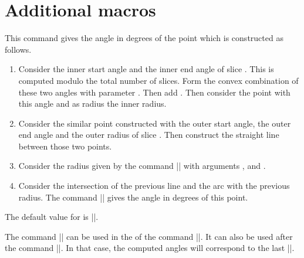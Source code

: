 \documentclass[a4paper,english,dvipsnames]{ltxdoc}
\begin{document}
\section{Additional macros}
\begin{command}{\WCangle{}}
This command gives the angle in degrees of the point which is constructed as follows.
\begin{enumerate}
\item Consider the inner start angle and the inner end angle of slice . This  is computed modulo the total number of slices. Form the convex combination of these two angles with parameter . Then add . Then consider the point with this angle and as radius the inner radius.
\item Consider the similar point constructed with the outer start angle, the outer end angle and the outer radius of slice . Then construct the straight line between those two points.
\item Consider the radius given by the command |\WCradius| with arguments ,  and .
\item Consider the intersection of the previous line and the arc with the previous radius. The command |\WCangle| gives the angle in degrees of this point.
\end{enumerate}
The default value for  is |\WCcount|.

The command |\WCangle| can be used in the  of the command |\wheelchart|. It can also be used after the command |\wheelchart|. In that case, the computed angles will correspond to the last |\wheelchart|.


\end{command}
\end{document}
